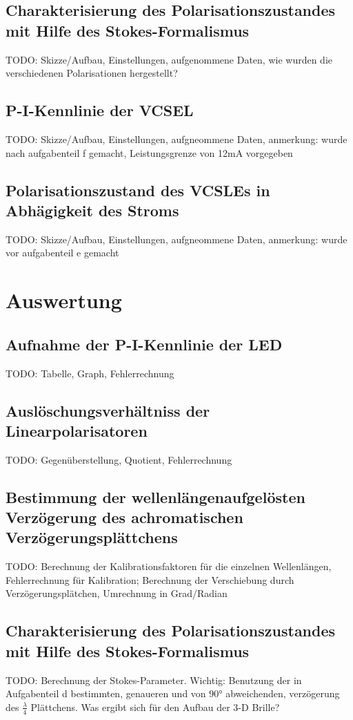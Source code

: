 \documentclass[bigchapter,colorback,accentcolor=tud4b,linedtoc,11pt]{tudreport}
\numberwithin{equation}{subsection}
\begin{document}
\section{Charakterisierung des Polarisationszustandes mit Hilfe des Stokes-Formalismus}
TODO: Skizze/Aufbau, Einstellungen, aufgenommene Daten, wie wurden die verschiedenen Polarisationen hergestellt?

\section{P-I-Kennlinie der VCSEL}
TODO: Skizze/Aufbau, Einstellungen, aufgneommene Daten, anmerkung: wurde nach aufgabenteil f gemacht, Leistungsgrenze von 12mA vorgegeben

\section{Polarisationszustand des VCSLEs in Abhägigkeit des Stroms}
TODO: Skizze/Aufbau, Einstellungen, aufgneommene Daten, anmerkung: wurde vor aufgabenteil e gemacht

\chapter{Auswertung}
\section{Aufnahme der P-I-Kennlinie der LED}
TODO: Tabelle, Graph, Fehlerrechnung

\section{Auslöschungsverhältniss der Linearpolarisatoren}
TODO: Gegenüberstellung, Quotient, Fehlerrechnung

\section{Bestimmung der wellenlängenaufgelösten Verzögerung des achromatischen Verzögerungsplättchens}
TODO: Berechnung der Kalibrationsfaktoren für die einzelnen Wellenlängen, Fehlerrechnung für Kalibration; Berechnung der Verschiebung durch Verzögerungsplätchen, Umrechnung in Grad/Radian

\section{Charakterisierung des Polarisationszustandes mit Hilfe des Stokes-Formalismus}
TODO: Berechnung der Stokes-Parameter. Wichtig: Benutzung der in Aufgabenteil d bestimmten, genaueren und von 90° abweichenden, verzögerung des $\frac{\lambda}{4}$ Plättchens. Was ergibt sich für den Aufbau der 3-D Brille?
\end{document}
